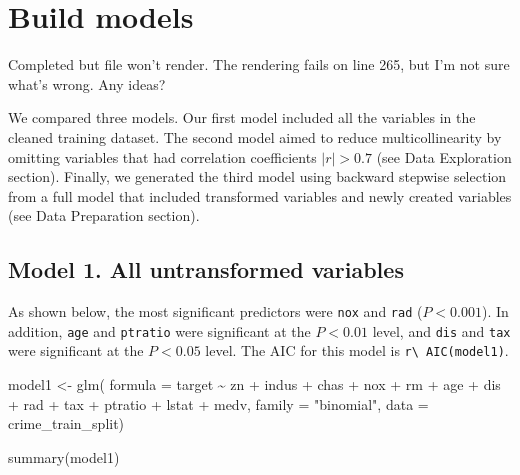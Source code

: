 \documentclass[
  11pt]{article}
\newenvironment{Shaded}{\begin{snugshade}}{\end{snugshade}}
\newcommand{\AttributeTok}[1]{\textcolor[rgb]{0.40,0.45,0.13}{#1}}
\newcommand{\FunctionTok}[1]{\textcolor[rgb]{0.28,0.35,0.67}{#1}}
\newcommand{\NormalTok}[1]{\textcolor[rgb]{0.00,0.23,0.31}{#1}}
\newcommand{\OtherTok}[1]{\textcolor[rgb]{0.00,0.23,0.31}{#1}}
\newcommand{\SpecialCharTok}[1]{\textcolor[rgb]{0.37,0.37,0.37}{#1}}
\newcommand{\StringTok}[1]{\textcolor[rgb]{0.13,0.47,0.30}{#1}}
\begin{document}
\section{Build models}\label{build-models}

\begin{tcolorbox}[enhanced jigsaw, titlerule=0mm, title=\textcolor{quarto-callout-note-color}{\faInfo}\hspace{0.5em}{Note}, toptitle=1mm, colframe=quarto-callout-note-color-frame, colback=white, coltitle=black, opacityback=0, bottomtitle=1mm, opacitybacktitle=0.6, leftrule=.75mm, rightrule=.15mm, colbacktitle=quarto-callout-note-color!10!white, arc=.35mm, toprule=.15mm, left=2mm, breakable, bottomrule=.15mm]

Completed but file won't render. The rendering fails on line 265, but
I'm not sure what's wrong. Any ideas?

\end{tcolorbox}

We compared three models. Our first model included all the variables in
the cleaned training dataset. The second model aimed to reduce
multicollinearity by omitting variables that had correlation
coefficients \(|r|>0.7\) (see Data Exploration section). Finally, we
generated the third model using backward stepwise selection from a full
model that included transformed variables and newly created variables
(see Data Preparation section).

\subsection{Model 1. All untransformed
variables}\label{model-1.-all-untransformed-variables}

As shown below, the most significant predictors were \texttt{nox} and
\texttt{rad} (\(P<0.001\)). In addition, \texttt{age} and
\texttt{ptratio} were significant at the \(P<0.01\) level, and
\texttt{dis} and \texttt{tax} were significant at the \(P<0.05\) level.
The AIC for this model is \texttt{r\textbackslash{}\ AIC(model1)}.

\begin{Shaded}
\begin{Highlighting}[]
\NormalTok{model1 }\OtherTok{\textless{}{-}} \FunctionTok{glm}\NormalTok{(}
  \AttributeTok{formula =}\NormalTok{ target }\SpecialCharTok{\textasciitilde{}}\NormalTok{ zn }\SpecialCharTok{+}\NormalTok{ indus }\SpecialCharTok{+}\NormalTok{ chas }\SpecialCharTok{+}\NormalTok{ nox }\SpecialCharTok{+}\NormalTok{ rm }\SpecialCharTok{+}\NormalTok{ age }\SpecialCharTok{+}\NormalTok{ dis }\SpecialCharTok{+}\NormalTok{ rad }\SpecialCharTok{+}\NormalTok{ tax }\SpecialCharTok{+}
\NormalTok{                     ptratio }\SpecialCharTok{+}\NormalTok{ lstat }\SpecialCharTok{+}\NormalTok{ medv,}
  \AttributeTok{family =} \StringTok{"binomial"}\NormalTok{,}
  \AttributeTok{data =}\NormalTok{ crime\_train\_split)}

\FunctionTok{summary}\NormalTok{(model1)}
\end{Highlighting}
\end{Shaded}
\end{document}
